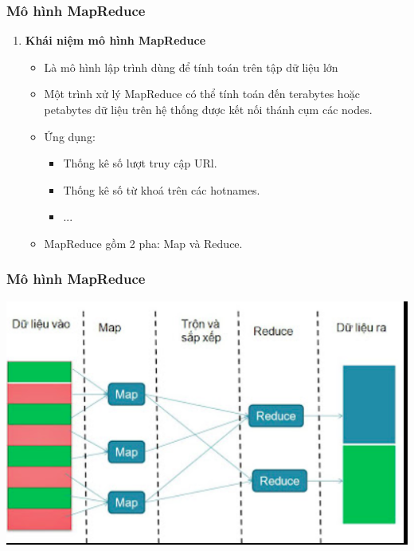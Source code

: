 \documentclass[12pt]{beamer}
\begin{document}
	\begin{frame}
		\frametitle{Mô hình MapReduce}
		\begin{enumerate} [\textbf{1.}]
			\item \textbf{Khái niệm mô hình MapReduce}
				\begin{itemize}
					\item Là mô hình lập trình dùng để tính toán trên tập dữ liệu lớn
					\item Một trình xử lý MapReduce có thể tính toán đến terabytes hoặc petabytes dữ liệu trên hệ thống được kết nối thánh cụm các nodes.
					\item Ứng dụng:
						\begin{itemize}
							\item Thống kê số lượt truy cập URl.
							\item Thống kê số từ khoá trên các hotnames.
							\item ...
						\end{itemize}
					\item MapReduce gồm 2 pha: Map và Reduce.
				\end{itemize}
		\end{enumerate}
	\end{frame}

	\begin{frame}
		\frametitle{Mô hình MapReduce}
		\includegraphics[width=\linewidth]{MapReduce.png}
	\end{frame}
\end{document}

